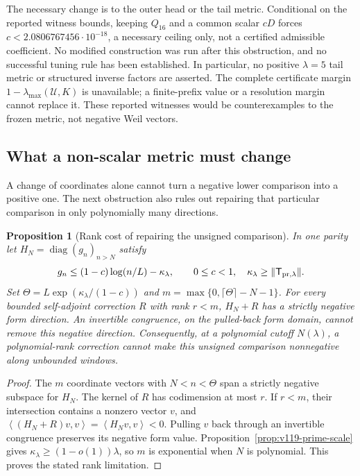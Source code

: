 \documentclass[11pt]{article}
\newtheorem{proposition}[theorem]{Proposition}
\theoremstyle{remark}
\newcommand{\ip}[2]{\left\langle #1,#2\right\rangle}
\begin{document}
The necessary change is to the outer head or the tail metric. Conditional on the reported witness bounds, keeping
$Q_{16}$ and a common scalar $cD$ forces
$c<2.0806767456\cdot10^{-18}$, a necessary ceiling only, not a certified
admissible coefficient. No modified construction was run after this
obstruction, and no successful tuning rule has been established.
In particular, no positive $\lambda=5$ tail metric or structured
inverse factors are asserted. The complete certificate margin
$1-\lambda_{\max}(\mathcal U,K)$ is unavailable; a finite-prefix value
or a resolution margin cannot replace it. These reported witnesses
would be counterexamples to the frozen metric, not negative Weil vectors.

\subsection*{What a non-scalar metric must change}
A change of coordinates alone cannot turn a negative lower comparison
into a positive one. The next obstruction also rules out repairing
that particular comparison in only polynomially many directions.

\begin{proposition}[Rank cost of repairing the unsigned comparison]
\label{prop:v127-rank-barrier}
In one parity let $H_N=\operatorname{diag}(g_n)_{n>N}$ satisfy
\[
 g_n\le(1-c)\log(n/L)-\kappa_\lambda,\qquad 0\le c<1,
 \quad \kappa_\lambda\ge\|\mathsf T_{{\rm pr},\lambda}\|.
\]
Set $\Theta=L\exp(\kappa_\lambda/(1-c))$ and
$m=\max\{0,\lceil\Theta\rceil-N-1\}$. For every bounded self-adjoint
correction $R$ with rank $r<m$, $H_N+R$ has a strictly negative
form direction. An invertible congruence, on the pulled-back form
domain, cannot remove this negative direction. Consequently, at a
polynomial cutoff $N(\lambda)$, a polynomial-rank correction cannot
make this unsigned comparison nonnegative along unbounded windows.
\end{proposition}
\begin{proof}
The $m$ coordinate vectors with $N<n<\Theta$ span a strictly negative
subspace for $H_N$. The kernel of $R$ has codimension at most $r$.
If $r<m$, their intersection contains a nonzero vector $v$, and
$\ip{(H_N+R)v}{v}=\ip{H_Nv}{v}<0$. Pulling $v$ back through an
invertible congruence preserves its negative form value.
Proposition~\ref{prop:v119-prime-scale} gives
$\kappa_\lambda\ge(1-o(1))\lambda$, so $m$ is exponential when
$N$ is polynomial. This proves the stated rank limitation.
\end{proof}
\end{document}

